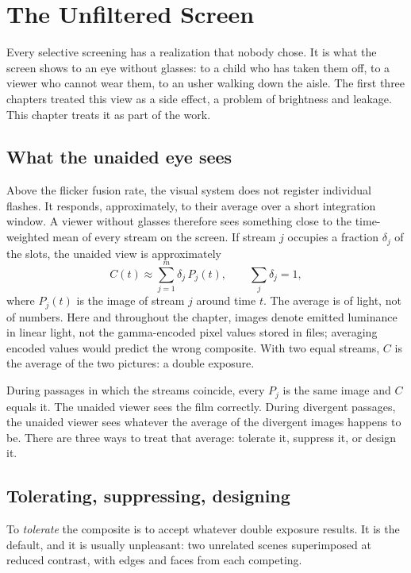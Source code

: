 \chapter{The Unfiltered Screen}\label{ch:unfiltered}

Every selective screening has a realization that nobody chose. It is what the screen shows to an eye without glasses: to a child who has taken them off, to a viewer who cannot wear them, to an usher walking down the aisle. The first three chapters treated this view as a side effect, a problem of brightness and leakage. This chapter treats it as part of the work.

\section{What the unaided eye sees}

Above the flicker fusion rate, the visual system does not register individual flashes. It responds, approximately, to their average over a short integration window. A viewer without glasses therefore sees something close to the time-weighted mean of every stream on the screen. If stream $j$ occupies a fraction $\delta_j$ of the slots, the unaided view is approximately
\begin{equation}
C(t)\approx\sum_{j=1}^{m}\delta_j\,P_j(t),
\qquad \sum_j\delta_j=1,
\end{equation}
where $P_j(t)$ is the image of stream $j$ around time $t$. The average is of light, not of numbers. Here and throughout the chapter, images denote emitted luminance in linear light, not the gamma-encoded pixel values stored in files; averaging encoded values would predict the wrong composite. With two equal streams, $C$ is the average of the two pictures: a double exposure.

During passages in which the streams coincide, every $P_j$ is the same image and $C$ equals it. The unaided viewer sees the film correctly. During divergent passages, the unaided viewer sees whatever the average of the divergent images happens to be. There are three ways to treat that average: tolerate it, suppress it, or design it.

\section{Tolerating, suppressing, designing}

To \emph{tolerate} the composite is to accept whatever double exposure results. It is the default, and it is usually unpleasant: two unrelated scenes superimposed at reduced contrast, with edges and faces from each competing.

